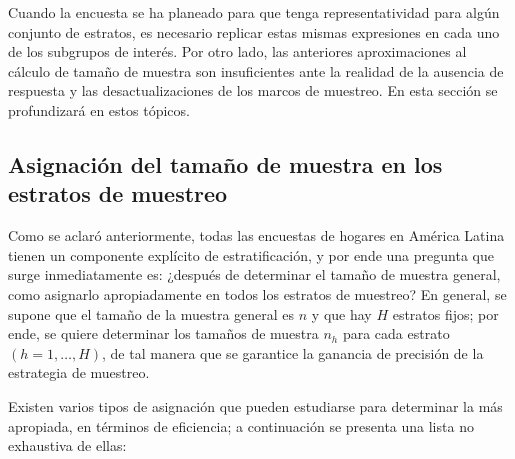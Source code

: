 \documentclass[
  12pt,
  spanish,
]{book}
\begin{document}
Cuando la encuesta se ha planeado para que tenga representatividad para algún conjunto de estratos, es necesario replicar estas mismas expresiones en cada uno de los subgrupos de interés. Por otro lado, las anteriores aproximaciones al cálculo de tamaño de muestra son insuficientes ante la realidad de la ausencia de respuesta y las desactualizaciones de los marcos de muestreo. En esta sección se profundizará en estos tópicos.

\hypertarget{asignaciuxf3n-del-tamauxf1o-de-muestra-en-los-estratos-de-muestreo}{%
\subsection{Asignación del tamaño de muestra en los estratos de muestreo}\label{asignaciuxf3n-del-tamauxf1o-de-muestra-en-los-estratos-de-muestreo}}

Como se aclaró anteriormente, todas las encuestas de hogares en América Latina tienen un componente explícito de estratificación, y por ende una pregunta que surge inmediatamente es: ¿después de determinar el tamaño de muestra general, como asignarlo apropiadamente en todos los estratos de muestreo? En general, se supone que el tamaño de la muestra general es \(n\) y que hay \(H\) estratos fijos; por ende, se quiere determinar los tamaños de muestra \(n_h\) para cada estrato \((h = 1, \ldots, H)\), de tal manera que se garantice la ganancia de precisión de la estrategia de muestreo.

Existen varios tipos de asignación que pueden estudiarse para determinar la más apropiada, en términos de eficiencia; a continuación se presenta una lista no exhaustiva de ellas:
\end{document}
